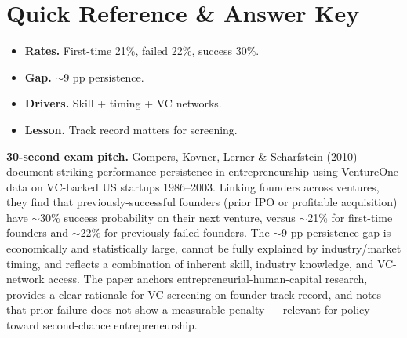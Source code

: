 \documentclass[11pt]{article}
\begin{document}
\section*{Quick Reference \& Answer Key}
\begin{answerbox}
\begin{itemize}
\item \textbf{Rates.} First-time 21\%, failed 22\%, success 30\%.
\item \textbf{Gap.} $\sim$9 pp persistence.
\item \textbf{Drivers.} Skill + timing + VC networks.
\item \textbf{Lesson.} Track record matters for screening.
\end{itemize}
\end{answerbox}

\begin{keybox}
\textbf{30-second exam pitch.} Gompers, Kovner, Lerner \& Scharfstein (2010) document striking performance persistence in entrepreneurship using VentureOne data on VC-backed US startups 1986--2003. Linking founders across ventures, they find that previously-successful founders (prior IPO or profitable acquisition) have $\sim$30\% success probability on their next venture, versus $\sim$21\% for first-time founders and $\sim$22\% for previously-failed founders. The $\sim$9 pp persistence gap is economically and statistically large, cannot be fully explained by industry/market timing, and reflects a combination of inherent skill, industry knowledge, and VC-network access. The paper anchors entrepreneurial-human-capital research, provides a clear rationale for VC screening on founder track record, and notes that prior failure does not show a measurable penalty --- relevant for policy toward second-chance entrepreneurship.
\end{keybox}
\end{document}
